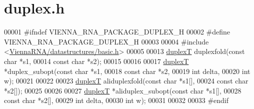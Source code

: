 \hypertarget{duplex_8h_source}{}\section{duplex.\+h}
\label{duplex_8h_source}

\begin{DoxyCode}
00001 \textcolor{preprocessor}{#ifndef VIENNA\_RNA\_PACKAGE\_DUPLEX\_H}
00002 \textcolor{preprocessor}{#define VIENNA\_RNA\_PACKAGE\_DUPLEX\_H}
00003 
00004 \textcolor{preprocessor}{#include <\hyperlink{datastructures_2basic_8h}{ViennaRNA/datastructures/basic.h}>}
00005 
00013 \hyperlink{group__data__structures_structduplexT}{duplexT} duplexfold(\textcolor{keyword}{const} \textcolor{keywordtype}{char} *s1,
00014                    \textcolor{keyword}{const} \textcolor{keywordtype}{char} *s2);
00015 
00016 
00017 \hyperlink{group__data__structures_structduplexT}{duplexT} *duplex\_subopt(\textcolor{keyword}{const} \textcolor{keywordtype}{char} *s1,
00018                        \textcolor{keyword}{const} \textcolor{keywordtype}{char} *s2,
00019                        \textcolor{keywordtype}{int}        delta,
00020                        \textcolor{keywordtype}{int}        w);
00021 
00022 
00023 \hyperlink{group__data__structures_structduplexT}{duplexT} aliduplexfold(\textcolor{keyword}{const} \textcolor{keywordtype}{char}  *s1[],
00024                       \textcolor{keyword}{const} \textcolor{keywordtype}{char}  *s2[]);
00025 
00026 
00027 \hyperlink{group__data__structures_structduplexT}{duplexT} *aliduplex\_subopt(\textcolor{keyword}{const} \textcolor{keywordtype}{char}  *s1[],
00028                           \textcolor{keyword}{const} \textcolor{keywordtype}{char}  *s2[],
00029                           \textcolor{keywordtype}{int}         delta,
00030                           \textcolor{keywordtype}{int}         w);
00031 
00032 
00033 \textcolor{preprocessor}{#endif}
\end{DoxyCode}
